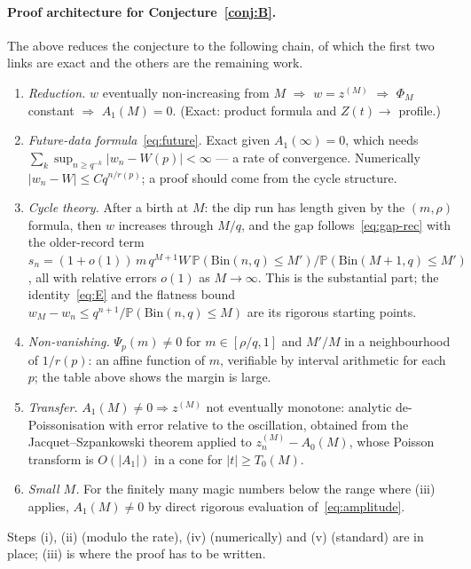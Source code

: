 \documentclass[11pt]{article}
\theoremstyle{definition}
\newcommand{\Bin}{\mathrm{Bin}}
\newcommand{\Prob}{\mathbb{P}}
\begin{document}
\paragraph{Proof architecture for Conjecture~\ref{conj:B}.}  The above
reduces the conjecture to the following chain, of which the first two
links are exact and the others are the remaining work.
\begin{enumerate}[label=(\roman*),leftmargin=2em]
\item \emph{Reduction.} $w$ eventually non-increasing from $M$ $\Rightarrow$
  $w=z^{(M)}$ $\Rightarrow$ $\Phi_M$ constant $\Rightarrow$ $A_1(M)=0$.
  (Exact: product formula and $Z(t)\to$ profile.)
\item \emph{Future-data formula}~\eqref{eq:future}. Exact given
  $A_1(\infty)=0$, which needs $\sum_k\sup_{n\ge q^{-k}}|w_n-W(p)|<\infty$
  --- a rate of convergence.  Numerically $|w_n-W|\le Cq^{n/r(p)}$; a
  proof should come from the cycle structure.
\item \emph{Cycle theory.}  After a birth at $M$: the dip run has
  length given by the $(m,\rho)$ formula, then $w$ increases through
  $M/q$, and the gap follows~\eqref{eq:gap-rec} with the older-record
  term $s_n=(1+o(1))\,m\,q^{M+1}W\,\Prob(\Bin(n,q)\le M')/\Prob(\Bin(M+1,q)\le M')$,
  all with relative errors $o(1)$ as $M\to\infty$.  This is the
  substantial part; the identity~\eqref{eq:E} and the flatness bound
  $w_M-w_n\le q^{n+1}/\Prob(\Bin(n,q)\le M)$ are its rigorous starting
  points.
\item \emph{Non-vanishing.}  $\Psi_p(m)\ne0$ for $m\in[\rho/q,1]$ and
  $M'/M$ in a neighbourhood of $1/r(p)$: an affine function of $m$,
  verifiable by interval arithmetic for each~$p$; the table above shows
  the margin is large.
\item \emph{Transfer.}  $A_1(M)\ne0\Rightarrow z^{(M)}$ not eventually
  monotone: analytic de-Poissonisation with error relative to the
  oscillation, obtained from the Jacquet--Szpankowski theorem applied to
  $z^{(M)}_n-A_0(M)$, whose Poisson transform is $O(|A_1|)$ in a cone
  for $|t|\ge T_0(M)$.
\item \emph{Small $M$.}  For the finitely many magic numbers below the
  range where (iii) applies, $A_1(M)\ne0$ by direct rigorous evaluation
  of~\eqref{eq:amplitude}.
\end{enumerate}
Steps (i), (ii) (modulo the rate), (iv) (numerically) and (v) (standard)
are in place; (iii) is where the proof has to be written.
\end{document}
